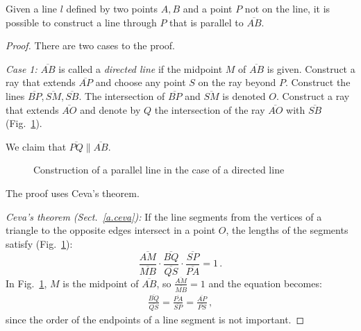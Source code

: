 \begin{theorem}\label{thm.straight-parallel}
Given a line $l$ defined by two points $A,B$ and a point $P$ not on the line, it is possible to construct a line through $P$ that is parallel to $\overline{AB}$.
\end{theorem}

\begin{proof}

There are two cases to the proof.

\textit{Case 1:}
$\overline{AB}$ is called a \emph{directed line} if the midpoint $M$ of $\overline{AB}$ is given.  Construct a ray that extends $\overline{AP}$ and choose any point $S$ on the ray beyond $P$. Construct the lines $\overline{BP}, \overline{SM}, \overline{SB}$. The intersection of $\overline{BP}$ and $\overline{SM}$ is denoted $O$. Construct a ray that extends $\overline{AO}$ and denote by $Q$ the intersection of the ray $\overline{AO}$ with $\overline{SB}$ (Fig.~\ref{f.se-parallel-directed}).

We claim that $\overline{PQ}\|\overline{AB}$. 

\begin{figure}[ht]
\begin{center}
\end{center}
\caption{Construction of a parallel line in the case of a directed line}\label{f.se-parallel-directed}
\end{figure}

\newpage
The proof uses Ceva's theorem.

\textit{Ceva's theorem  (Sect.~\ref{a.ceva}):} If the line segments from the vertices of a triangle to the opposite edges intersect in a point $O$, the lengths of the segments satisfy (Fig.~\ref{f.se-parallel-directed}):
\[
\frac{\overline{AM}}{\overline{MB}}\cdot\frac{\overline{BQ}}{\overline{QS}}\cdot\frac{\overline{SP}}{\overline{PA}} = 1\,.
\]
In Fig.~\ref{f.se-parallel-directed}, $M$ is the midpoint of $\overline{AB}$, so $\displaystyle\frac{\overline{AM}}{\overline{MB}}=1$ and the equation becomes:
\begin{align}
\frac{\overline{BQ}}{\overline{QS}}=\frac{\overline{PA}}{\overline{SP}}=\frac{\overline{AP}}{\overline{PS}}\,,\label{eq.ceva}
\end{align}
since the order of the endpoints of a line segment is not important.


\end{proof}
